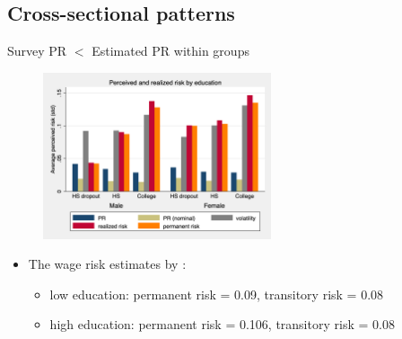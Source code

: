 \documentclass{beamer}
\begin{document}
\subsection{Cross-sectional patterns}



\begin{frame}{Survey PR $<$ Estimated PR within groups}
	\label{observable_heterogeneity_by_educ}
	\begin{figure}[ht]
		\label{compare_by_gender_educ}
		\centering
		\includegraphics[width=0.60\textwidth]{figures/boxplot_rvar_compare_educ.png}
	\end{figure}
\pause 
	\begin{itemize}
		\item The wage risk estimates by  \cite{low2010wage}: 
		\begin{itemize}
			\item low education: permanent risk = 0.09, transitory risk = 0.08
			\item high education: permanent risk = 0.106, transitory risk = 0.08
	\end{itemize}
\end{itemize}
\end{frame}

\end{document}
